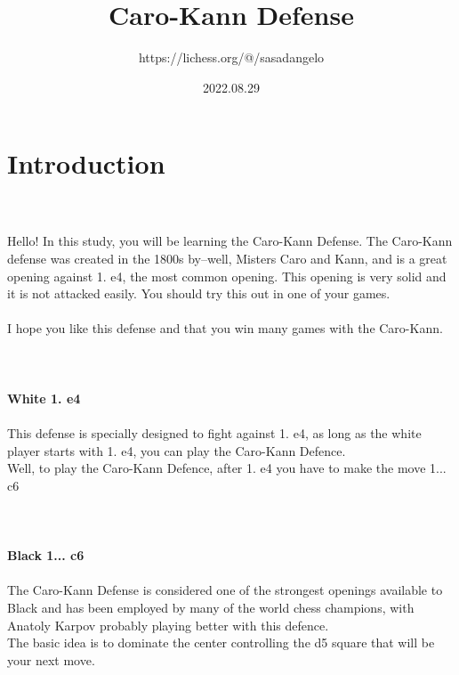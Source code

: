 \documentclass{article}
\title{Caro-Kann Defense}
\author{https://lichess.org/@/sasadangelo}
\date{2022.08.29}
\begin{document}
\begin{titlepage}
\maketitle
\end{titlepage}
\section{ Introduction}

\\
\\
Hello! In this study, you will be learning the Caro-Kann Defense. The Caro-Kann defense was created in the 1800s by--well, Misters Caro and Kann, and is a great opening against 1. e4, the most common opening. This opening is very solid and it is not attacked easily. You should try this out in one of your games.\\\\I hope you like this defense and that you win many games with the Caro-Kann.\\
\\

\\
\\
\textbf{White 1. e4}\\
\\
This defense is specially designed to fight against 1. e4, as long as the white player starts with 1. e4, you can play the Caro-Kann Defence.\\Well, to play the Caro-Kann Defence, after 1. e4 you have to make the move 1... c6\\
\\

\\
\\
\textbf{Black 1... c6}\\
\\
The Caro-Kann Defense is considered one of the strongest openings available to Black and has been employed by many of the world chess champions, with Anatoly Karpov probably playing better with this defence.\\The basic idea is to dominate the center controlling the d5 square that will be your next move. \\
\\

\\
\\
\end{document}
